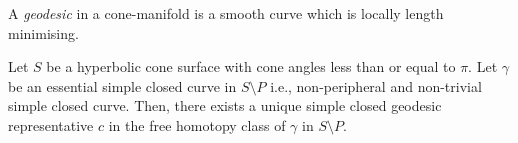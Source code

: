\begin{defn}
	A \textit{geodesic} in a cone-manifold is a smooth curve which is locally length minimising.
\end{defn}

\begin{theorem} \cite[Theorem 5.1]{SPTAN} \label{thm:scgeodesic_existence}
Let $S$ be a hyperbolic cone surface with cone angles less than or equal to $\pi$. Let $\gamma$ be an essential simple closed curve in $S \setminus P$ i.e., non-peripheral and non-trivial simple closed curve. Then, there exists a unique simple closed geodesic representative $c$ in the free homotopy class of $\gamma$ in $S \setminus P$. 
\end{theorem} 

